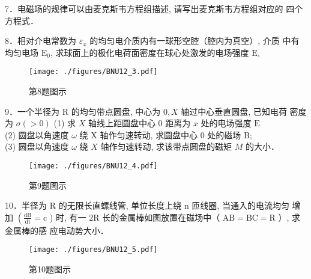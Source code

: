 7．电磁场的规律可以由麦克斯韦方程组描述, 请写出麦克斯韦方程组对应的 四个方程式．

8．相对介电常数为 $\varepsilon_{x}$ 的均匀电介质内有一球形空腔（腔内为真空）, 介质 中有均匀电场 $\mathrm{E}_{0}$, 求球面上的极化电荷面密度在球心处激发的电场强度 $\mathrm{E}_{\circ}$
\begin{figure}[ht]
\centering
\texttt{[image: ./figures/BNU12\_3.pdf]}
\caption{第8题图示} \label{BNU12_fig3}
\end{figure}

9．一个半径为 $\mathrm{R}$ 的均匀带点圆盘, 中心为 $0, X$ 轴过中心垂直圆盘, 已知电荷 密度为 $\sigma(>0)$
(1) 求 $X$ 轴线上距圆盘中心 0 距离为 $x$ 处的电场强度 $\mathrm{E} $\\
(2) 圆盘以角速度 $\omega$ 绕 $\mathrm{X}$ 轴作匀速转动, 求圆盘中心 0 处的磁场 B;\\
(3) 圆盘以角速度 $\omega$ 绕 $X$ 轴作匀速转动, 求该带点圆盘的磁矩 $M$ 的大小．
\begin{figure}[ht]
\centering
\texttt{[image: ./figures/BNU12\_4.pdf]}
\caption{第9题图示} \label{BNU12_fig4}
\end{figure}

10．半径为 $\mathrm{R}$ 的无限长直螺线管, 单位长度上绕 $\mathrm{n}$ 匝线圈, 当通入的电流均匀
增加 $\left(\frac{\mathrm{dB}}{\mathrm{dt}}=\mathrm{c}\right.$ ) 时, 有一 $2 \mathrm{R}$ 长的金属棒如图放置在磁场中（ $\mathrm{AB}=\mathrm{BC}=\mathrm{R}$ ）, 求金属棒的感
应电动势大小．
\begin{figure}[ht]
\centering
\texttt{[image: ./figures/BNU12\_5.pdf]}
\caption{第10题图示} \label{BNU12_fig5}
\end{figure}